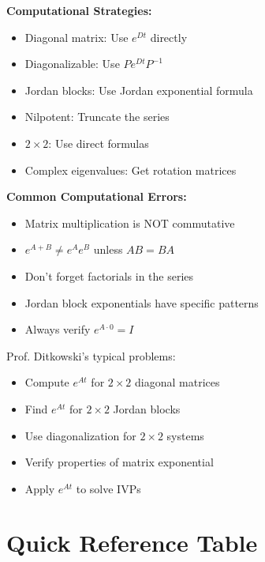 \documentclass[12pt]{article}
\begin{document}
\begin{insight}
\textbf{Computational Strategies:}
\begin{itemize}
\item Diagonal matrix: Use $e^{Dt}$ directly
\item Diagonalizable: Use $Pe^{Dt}P^{-1}$
\item Jordan blocks: Use Jordan exponential formula
\item Nilpotent: Truncate the series
\item $2\times 2$: Use direct formulas
\item Complex eigenvalues: Get rotation matrices
\end{itemize}
\end{insight}

\begin{warning}
\textbf{Common Computational Errors:}
\begin{itemize}
\item Matrix multiplication is NOT commutative
\item $e^{A+B} \neq e^{A}e^{B}$ unless $AB = BA$
\item Don't forget factorials in the series
\item Jordan block exponentials have specific patterns
\item Always verify $e^{A \cdot 0} = I$
\end{itemize}
\end{warning}

\begin{examtip}
Prof. Ditkowski's typical problems:
\begin{itemize}
\item Compute $e^{At}$ for $2\times 2$ diagonal matrices
\item Find $e^{At}$ for $2\times 2$ Jordan blocks
\item Use diagonalization for $2\times 2$ systems
\item Verify properties of matrix exponential
\item Apply $e^{At}$ to solve IVPs
\end{itemize}
\end{examtip}

\section{Quick Reference Table}
\end{document}

